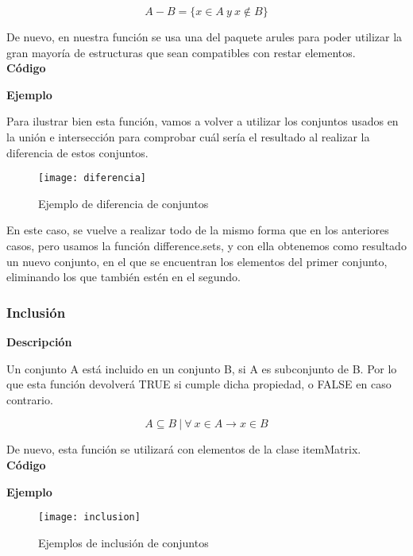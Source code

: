     \[
    A - B = \{x\in A ~ y ~ x\notin B \}
    \]

    De nuevo, en nuestra funci\'on se usa una del paquete arules para poder utilizar la gran mayor\'ia de estructuras 
    que sean compatibles con restar elementos.
    \\


    \textbf{C\'odigo}

    
    
    \textbf{Ejemplo}

    Para ilustrar bien esta funci\'on, vamos a volver a utilizar los conjuntos usados en la uni\'on e intersecci\'on para comprobar 
    cu\'al ser\'ia el resultado al realizar la diferencia de estos conjuntos.

    \begin{figure}[H]
        \centering
        \texttt{[image: diferencia]}
        \caption{Ejemplo de diferencia de conjuntos}
        \label{fig:diferencia}
    \end{figure}

    En este caso, se vuelve a realizar todo de la mismo forma que en los anteriores casos, pero usamos la funci\'on difference.sets, y 
    con ella obtenemos como resultado un nuevo conjunto, en el que se encuentran los elementos del primer conjunto, eliminando los que 
    tambi\'en est\'en en el segundo.



\subsubsection{Inclusi\'on}

    \textbf{Descripci\'on}

    Un conjunto A est\'a incluido en un conjunto B, si A es subconjunto de B. Por lo que esta funci\'on 
    devolver\'a TRUE si cumple dicha propiedad, o FALSE en caso contrario.

    \[
    A \subseteq B ~ | ~  \forall ~ x \in A \to x \in B 
    \]

    De nuevo, esta funci\'on se utilizar\'a con elementos de la clase itemMatrix.
    \\


    \textbf{C\'odigo}

    


    \textbf{Ejemplo}

    \begin{figure}[H]
        \centering
        \texttt{[image: inclusion]}
        \caption{Ejemplos de inclusi\'on de conjuntos}
        \label{fig:inclusion}
    \end{figure}


